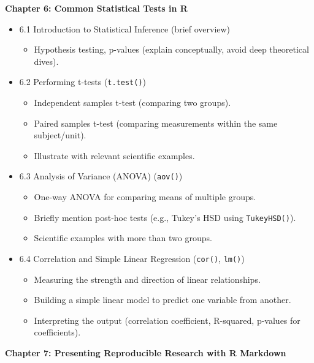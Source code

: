 \documentclass[
  letterpaper,
  DIV=11,
  numbers=noendperiod]{scrreprt}
\providecommand{\tightlist}{%
  \setlength{\itemsep}{0pt}\setlength{\parskip}{0pt}}\usepackage{longtable,booktabs,array}
\begin{document}
\textbf{Chapter 6: Common Statistical Tests in R}

\begin{itemize}
\tightlist
\item
  6.1 Introduction to Statistical Inference (brief overview)

  \begin{itemize}
  \tightlist
  \item
    Hypothesis testing, p-values (explain conceptually, avoid deep
    theoretical dives).
  \end{itemize}
\item
  6.2 Performing t-tests (\texttt{t.test()})

  \begin{itemize}
  \tightlist
  \item
    Independent samples t-test (comparing two groups).
  \item
    Paired samples t-test (comparing measurements within the same
    subject/unit).
  \item
    Illustrate with relevant scientific examples.
  \end{itemize}
\item
  6.3 Analysis of Variance (ANOVA) (\texttt{aov()})

  \begin{itemize}
  \tightlist
  \item
    One-way ANOVA for comparing means of multiple groups.
  \item
    Briefly mention post-hoc tests (e.g., Tukey's HSD using
    \texttt{TukeyHSD()}).
  \item
    Scientific examples with more than two groups.
  \end{itemize}
\item
  6.4 Correlation and Simple Linear Regression (\texttt{cor()},
  \texttt{lm()})

  \begin{itemize}
  \tightlist
  \item
    Measuring the strength and direction of linear relationships.
  \item
    Building a simple linear model to predict one variable from another.
  \item
    Interpreting the output (correlation coefficient, R-squared,
    p-values for coefficients).
  \end{itemize}
\end{itemize}

\textbf{Chapter 7: Presenting Reproducible Research with R Markdown}
\end{document}
